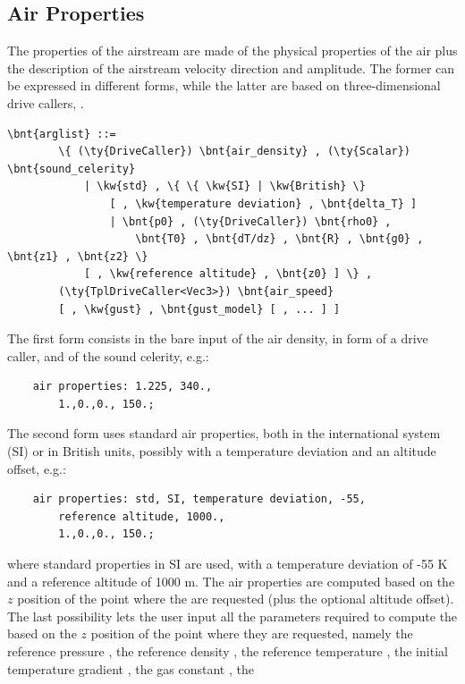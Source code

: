 \subsection{Air Properties}\label{sec:EL:AERO:AIRPROPERTIES}
The properties of the airstream are made of the physical properties
of the air plus the description of the airstream velocity direction
and amplitude.
The former can be expressed in different forms, while the latter
are based on three-dimensional drive callers, .
\begin{Verbatim}[commandchars=\\\{\}]
    \bnt{arglist} ::=
        \{ (\ty{DriveCaller}) \bnt{air_density} , (\ty{Scalar}) \bnt{sound_celerity}
            | \kw{std} , \{ \{ \kw{SI} | \kw{British} \}
                [ , \kw{temperature deviation} , \bnt{delta_T} ]
                | \bnt{p0} , (\ty{DriveCaller}) \bnt{rho0} ,
                    \bnt{T0} , \bnt{dT/dz} , \bnt{R} , \bnt{g0} , \bnt{z1} , \bnt{z2} \}
            [ , \kw{reference altitude} , \bnt{z0} ] \} ,
        (\ty{TplDriveCaller<Vec3>}) \bnt{air_speed}
        [ , \kw{gust} , \bnt{gust_model} [ , ... ] ]
\end{Verbatim}
The first form consists in the bare input of the air density,
in form of a drive caller, and of the sound celerity, e.g.:
\begin{verbatim}
    air properties: 1.225, 340.,
        1.,0.,0., 150.;
\end{verbatim}
The second form uses standard air properties, both in the
international system (SI) or in British units, possibly
with a temperature deviation and an altitude offset, e.g.:
\begin{verbatim}
    air properties: std, SI, temperature deviation, -55,
        reference altitude, 1000.,
        1.,0.,0., 150.;
\end{verbatim}
where standard properties in SI are used, with a temperature
deviation of -55 K and a reference altitude of 1000 m.
The air properties are computed based on the $z$ position of the
point where the  are requested (plus the optional
altitude offset).
The last possibility lets the user input all the parameters
required to compute the  based on the $z$ position
of the point where they are requested, namely the reference
pressure , the reference density ,
the reference temperature , the initial temperature
gradient , the gas constant , the
